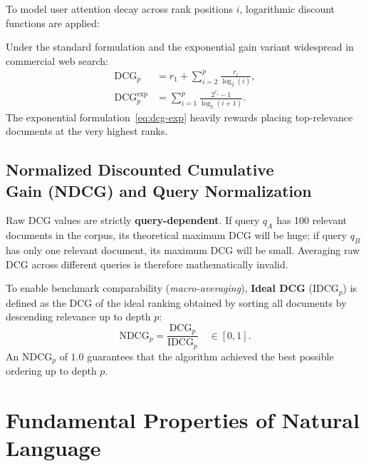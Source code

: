 To model user attention decay across rank positions $i$, logarithmic discount functions are applied:

\begin{definition}
Under the standard formulation and the exponential gain variant widespread in commercial web search:
\begin{align}
\text{DCG}_p &= r_1 + \sum_{i=2}^{p} \frac{r_i}{\log_2(i)}, \label{eq:dcg-std} \\
\text{DCG}_p^{\text{exp}} &= \sum_{i=1}^{p} \frac{2^{r_i} - 1}{\log_2(i + 1)}. \label{eq:dcg-exp}
\end{align}
The exponential formulation~\eqref{eq:dcg-exp} heavily rewards placing top-relevance documents at the very highest ranks.
\end{definition}

\subsection[Normalized Discounted Cumulative Gain (NDCG)]{Normalized Discounted Cumulative\\ Gain (NDCG) and Query Normalization}

Raw DCG values are strictly \textbf{query-dependent}. If query $q_A$ has 100 relevant documents in the corpus, its theoretical maximum DCG will be huge; if query $q_B$ has only one relevant document, its maximum DCG will be small. Averaging raw DCG across different queries is therefore mathematically invalid.

To enable benchmark comparability (\textit{macro-averaging}), \textbf{Ideal DCG} ($\text{IDCG}_p$) is defined as the DCG of the ideal ranking obtained by sorting all documents by descending relevance up to depth $p$:
\begin{equation}
\text{NDCG}_p = \frac{\text{DCG}_p}{\text{IDCG}_p} \quad \in [0, 1].
\end{equation}
An $\text{NDCG}_p$ of $1.0$ guarantees that the algorithm achieved the best possible ordering up to depth $p$.

\FloatBarrier
\section{Fundamental Properties of Natural Language}
\label{sec:language-properties}


